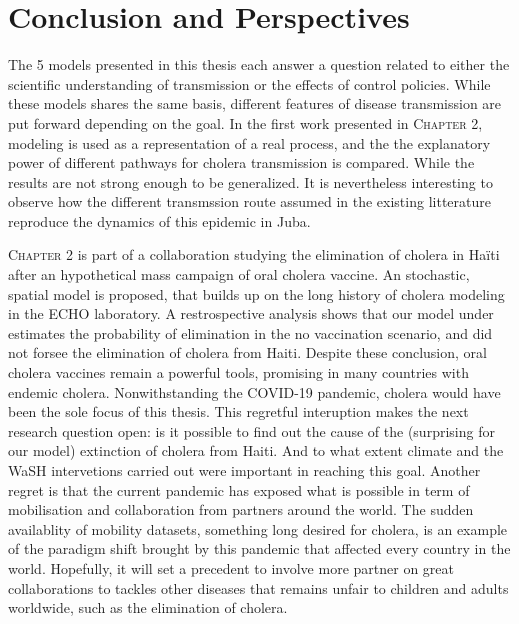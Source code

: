 \chapter*{Conclusion and Perspectives}
The 5 models presented in this thesis each answer a question related to either the scientific understanding of transmission or the effects of control policies. While these models shares the same basis, different features of disease transmission are put forward depending on the goal. 
In the first work presented in \textsc{Chapter 2}, modeling is used as a representation of a real process, and the the explanatory power of different pathways for cholera transmission is compared. While the results are not strong enough to be generalized. It is nevertheless interesting to observe how the different transmssion route assumed in the existing litterature reproduce the dynamics of this epidemic in Juba.

\textsc{Chapter 2} is part of a collaboration studying the elimination of cholera in Haïti after an hypothetical mass campaign of oral cholera vaccine. An stochastic, spatial model is proposed, that builds up on the long history of cholera modeling in the ECHO laboratory. A restrospective analysis shows that our model under estimates the probability of elimination in the no vaccination scenario, and did not forsee the elimination of cholera from Haiti. Despite these conclusion, oral cholera vaccines remain a powerful tools, promising in many countries with endemic cholera. 
Nonwithstanding the COVID-19 pandemic, cholera would have been the sole focus of this thesis. This regretful interuption makes the next research question open: is it possible to find out the cause of the (surprising for our model) extinction of cholera from Haiti. And to what extent climate and the WaSH intervetions carried out were important in reaching this goal. Another regret is that the current pandemic has exposed what is possible in term of mobilisation and collaboration from partners around the world. The sudden availablity of mobility datasets, something long desired for cholera, is an example of the paradigm shift brought by this pandemic that affected every country in the world. Hopefully, it will set a precedent to involve more partner on great collaborations to tackles other diseases that remains unfair to children and adults worldwide, such as the elimination of cholera.

